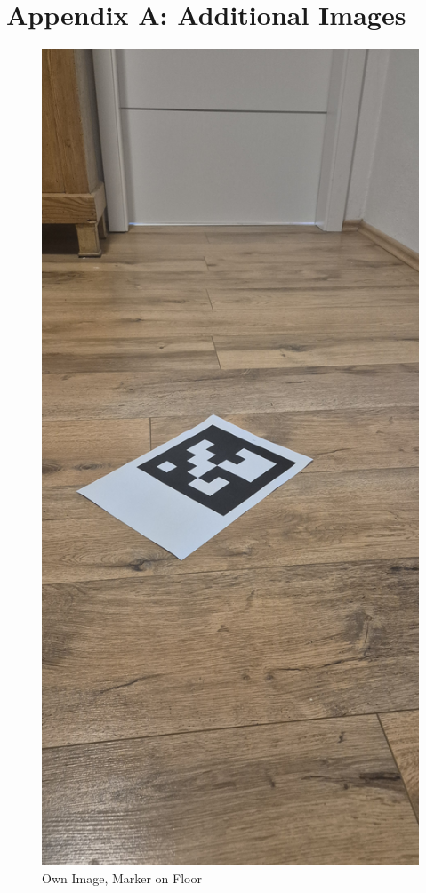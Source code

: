 \documentclass[a4paper,twocolumn]{article}
\begin{document}
\appendix
\section*{Appendix A: Additional Images}

\begin{figure}[h!]
    \centering
    \includegraphics[width=\textwidth, keepaspectratio]{newImg/20241129_153124.jpg}
    \caption{Own Image, Marker on Floor \cite{tim-schweitzer}}
    \label{fig:example-appendix1}
\end{figure}
\end{document}
